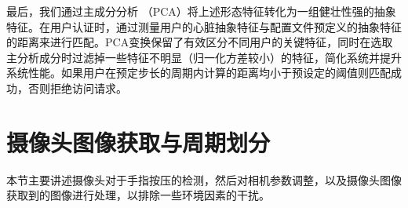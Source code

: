 \par
{最后，我们通过主成分分析 （PCA）将上述形态特征转化为一组健壮性强的抽象特征。在用户认证时，通过测量用户的心脏抽象特征与配置文件预定义的抽象特征的距离来进行匹配。PCA变换保留了有效区分不同用户的关键特征，同时在选取主分析成分时过滤掉一些特征不明显（归一化方差较小）的特征，简化系统并提升系统性能。如果用户在预定步长的周期内计算的距离均小于预设定的阈值则匹配成功，否则拒绝访问请求。}
%
%
%
%
%
%

\section{摄像头图像获取与周期划分}
{本节主要讲述摄像头对于手指按压的检测，然后对相机参数调整，以及摄像头图像获取到的图像进行处理，以排除一些环境因素的干扰。}
